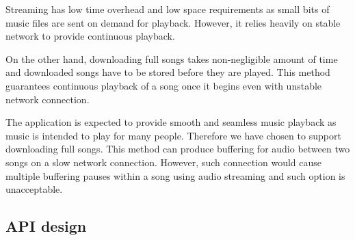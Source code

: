 \par
Streaming has low time overhead and low space requirements as small bits of music files are sent on demand for playback. However, it relies heavily on stable network to provide continuous playback.
\par
On the other hand, downloading full songs takes non-negligible amount of time and downloaded songs have to be stored before they are played. This method guarantees continuous playback of a song once it begins even with unstable network connection.
\par
The application is expected to provide smooth and seamless music playback as music is intended to play for many people. Therefore we have chosen to support downloading full songs. This method can produce buffering for audio between two songs on a slow network connection. However, such connection would cause multiple buffering pauses within a song using audio streaming and such option is unacceptable.

\subsection{API design}

